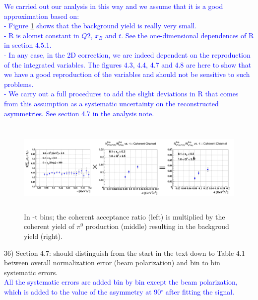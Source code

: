    \textcolor{blue}{We carried out our analysis in this way and we assume that 
      it is a good approximation based on:\\
      - Figure \ref{fig:coh_back_yield} shows that the background yield is 
      really very small.\\
      - R is alomst constant in $Q2$, $x_B$ and $t$. See the one-dimensional 
      dependences of R in section 4.5.1.\\
      - In any case, in the 2D correction, we are indeed dependent on the 
      reproduction of the integrated variables.  The figures 4.3, 4.4, 4.7 and 
      4.8 are here to show that we have a good reproduction of the variables 
      and should not be sensitive to such problems.\\
      - We carry out a full procedures to add the slight deviations in R that 
      comes from this assumption as a systematic uncertainty on the 
      reconstructed asymmetries. See section 4.7 in the analysis note.
}\\


\begin{figure}[tbp]
\centering
\includegraphics[height=4.5cm]{fig/coh_back_yield.png}
\caption{In -t bins; the coherent acceptance ratio (left) is multiplied by the 
coherent yield of $\pi^{0}$ production (middle) resulting in the backgroud 
yield (right).}
\label{fig:coh_back_yield}
 \end{figure}




36) Section 4.7: should distinguish from the start in the text down to Table 
4.1 between overall normalization error (beam polarization) and bin to bin 
systematic errors. \\
\textcolor{blue}{All the systematic errors are added bin by bin except the beam 
polarization, which is added to the value of the asymmetry at 90$^{\circ}$ after 
fitting the signal.}\\


